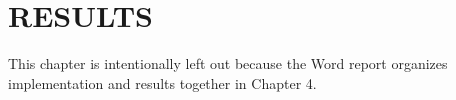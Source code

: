 \chapter{RESULTS}
\label{ch:results}

This chapter is intentionally left out because the Word report organizes implementation and results together in Chapter 4.
